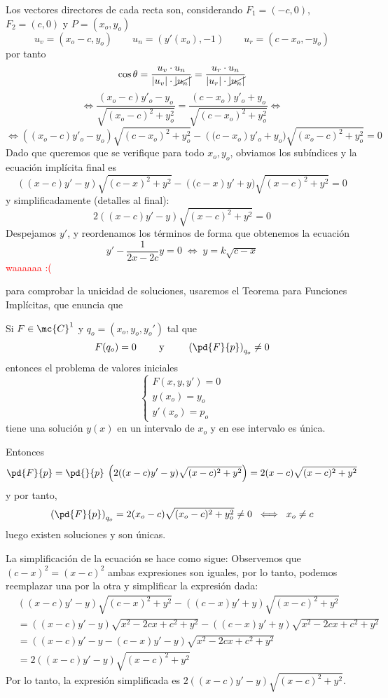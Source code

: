 \begin{enumerate}
\begin{sol}
 Los vectores directores de cada recta son, considerando $F_1=(-c,0)$, $F_2=(c,0)$ y $P=(x_o,y_o)$ 
 $$u_v=(x_o-c,y_o) \qquad u_n=(y'(x_o), -1) \qquad u_r=(c-x_o,-y_o)$$
 por tanto
 $$\cos \theta=\dfrac{u_v \cdot u_n}{|u_v|\cdot \cancel{|u_n|}}=\dfrac{u_r \cdot u_n}{|u_r|\cdot \cancel{|u_n|}} $$
 $$\iff \dfrac{(x_o-c)y'_o-y_o}{\sqrt{(x_o-c)^2+y_o^2}}=\dfrac{(c-x_o)y'_o+y_o}{\sqrt{(c-x_o)^2+y_o^2}}\iff $$
 $$\iff \left((x_o-c)y'_o-y_o\right) \sqrt{(c-x_o)^2+y_o^2} - \left((c-x_o\right)y'_o+y_o) \sqrt{(x_o-c)^2+y_o^2} = 0$$
 Dado que queremos que se verifique para todo $x_o,y_o$, obviamos los subíndices y la ecuación implícita final es
 $$\left((x-c)y'-y\right) \sqrt{(c-x)^2+y^2} - \left((c-x\right)y'+y) \sqrt{(x-c)^2+y^2} = 0$$
 y simplificadamente (detalles al final):
 $$2((x-c)y'-y) \sqrt{(x-c)^2 + y^2}= 0 $$
Despejamos $y'$, y reordenamos los términos de forma que obtenemos la ecuación
$$y'-\dfrac{1}{2x-2c}y=0 \; \iff \; y=k\sqrt{c-x}$$ \textcolor{red}{waaaaaa :( }
 
 
 para comprobar la unicidad de soluciones, usaremos el Teorema para Funciones Implícitas, que enuncia que \vspace{5mm}

 Si $F \in \mc{C}^1$ y $q_o = (x_o,y_o,y_o') $ tal que $$F(q_o)=0 \qquad \text{ y } \qquad \left( \pd{F}{p} \right)_{q_o} \neq 0$$ entonces el problema de valores iniciales
 $$\left\{ \begin{array}{l}
      F(x,y,y')= 0 \\ y(x_o)=y_o \\ y'(x_o)=p_o
 \end{array} \right.$$
 tiene una solución $y(x)$ en un intervalo de $x_o$ y en ese intervalo es única.

 Entonces
 $$\pd{F}{p}= \pd{}{p} \: \left(2((x-c)y'-y) \sqrt{(x-c)^2 + y^2} \right) = 2(x-c)\sqrt{(x-c)^2+y^2} $$
 y por tanto, 
 $$\left( \pd{F}{p} \right)_{q_o} =   2(x_o-c)\sqrt{(x_o-c)^2+y_o^2}\neq 0 \; \iff \; x_o \neq c$$
 luego existen soluciones y son únicas.

La simplificación de la ecuación se hace como sigue:
Observemos que $(c-x)^2=(x-c)^2$ ambas expresiones son iguales, por lo tanto, podemos reemplazar una por la otra y simplificar la expresión dada:
\begin{align*}
&\left((x-c)y'-y\right) \sqrt{(c-x)^2+y^2} - \left((c-x)y'+y\right) \sqrt{(x-c)^2+y^2}\\
&= \left((x-c)y'-y\right) \sqrt{x^2 - 2cx + c^2 + y^2} - \left((c-x)y'+y\right) \sqrt{x^2 - 2cx + c^2 + y^2}\\
&= \left((x-c)y' - y - (c-x)y' - y\right) \sqrt{x^2 - 2cx + c^2 + y^2}\\
&= 2((x-c)y'-y)  \sqrt{(x-c)^2 + y^2}
\end{align*}
Por lo tanto, la expresión simplificada es $2((x-c)y'-y) \sqrt{(x-c)^2 + y^2}$.
\end{sol}


\end{enumerate}
